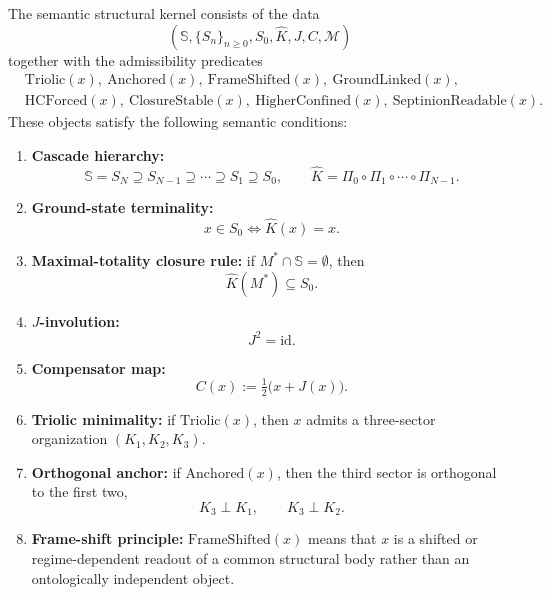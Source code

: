 \begin{definition}
\label{def:semantic-structural-kernel}
The semantic structural kernel consists of the data
\[
(\mathbb S,\{S_n\}_{n\ge 0},S_0,\hat K,J,C,\mathcal M)
\]
together with the admissibility predicates
\[
\begin{aligned}
&\mathrm{Triolic}(x),\ \mathrm{Anchored}(x),\ \mathrm{FrameShifted}(x),\ \mathrm{GroundLinked}(x),\\
&\mathrm{HCForced}(x),\ \mathrm{ClosureStable}(x),\ \mathrm{HigherConfined}(x),\ \mathrm{SeptinionReadable}(x).
\end{aligned}
\]
These objects satisfy the following semantic conditions:
\begin{enumerate}[leftmargin=2em,label=(S\arabic*)]
\item \textbf{Cascade hierarchy:}
\[
\mathbb S=S_N\supseteq S_{N-1}\supseteq \cdots \supseteq S_1\supseteq S_0,
\qquad
\hat K=\Pi_0\circ\Pi_1\circ\cdots\circ\Pi_{N-1}.
\]
\item \textbf{Ground-state terminality:}
\[
x\in S_0 \Longleftrightarrow \hat K(x)=x.
\]
\item \textbf{Maximal-totality closure rule:} if $M^*\cap \mathbb S=\emptyset$, then
\[
\hat K(M^*)\subseteq S_0.
\]
\item \textbf{$J$-involution:}
\[
J^2=\mathrm{id}.
\]
\item \textbf{Compensator map:}
\[
C(x):=\tfrac12\bigl(x+J(x)\bigr).
\]
\item \textbf{Triolic minimality:} if $\mathrm{Triolic}(x)$, then $x$ admits a three-sector
organization $(K_1,K_2,K_3)$.
\item \textbf{Orthogonal anchor:} if $\mathrm{Anchored}(x)$, then the third sector is
orthogonal to the first two,
\[
K_3\perp K_1,
\qquad
K_3\perp K_2.
\]
\item \textbf{Frame-shift principle:} $\mathrm{FrameShifted}(x)$ means that $x$ is a shifted
or regime-dependent readout of a common structural body rather than an
ontologically independent object.
\end{enumerate}
\end{definition}

